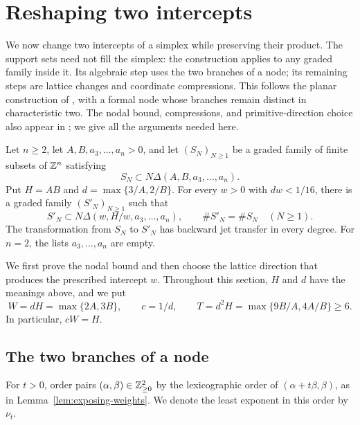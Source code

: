 \section{Reshaping two intercepts}\label{sec:reshape}

We now change two intercepts of a simplex while preserving their product.
The support sets need not fill the simplex: the construction applies to any
graded family inside it.  Its algebraic step uses the two branches of a node;
its remaining steps are lattice changes and coordinate compressions.
This follows the planar construction of
\citet[Section~4, Proposition~4.1]{OpenAI2026Higher}, with a formal node
whose branches remain distinct in characteristic two.  The nodal bound,
compressions, and primitive-direction choice also appear in
\citet[Propositions~3.2 and~3.4, Lemma~4.3]{OpenAI2026Surfaces};
we give all the arguments needed here.

\begin{proposition}\label{prop:reshape}
Let $n\ge2$, let $A,B,a_3,\ldots,a_n>0$, and let $(S_N)_{N\ge1}$ be a
graded family of finite subsets of $\mathbb Z^n$ satisfying
\[
 S_N\subset N\Delta(A,B,a_3,\ldots,a_n).
\]
Put $H=AB$ and $d=\max\{3/A,2/B\}$.  For every $w>0$ with $dw<1/16$,
there is a graded family $(S'_N)_{N\ge1}$ such that
\[
 S'_N\subset N\Delta(w,H/w,a_3,\ldots,a_n),
 \qquad \#S'_N=\#S_N \quad(N\ge1).
\]
The transformation from $S_N$ to $S'_N$ has backward jet transfer in every
degree.  For $n=2$, the lists $a_3,\ldots,a_n$ are empty.
\end{proposition}

We first prove the nodal bound and then choose the lattice direction that
produces the prescribed intercept $w$.  Throughout this section, $H$ and $d$
have the meanings above, and we put
\begin{equation}\label{eq:reshape-constants}
 W=dH=\max\{2A,3B\},\qquad c=1/d,\qquad
 T=d^2H=\max\{9B/A,4A/B\}\ge6.
\end{equation}
In particular, $cW=H$.

\subsection{The two branches of a node}

For $t>0$, order pairs $(\alpha,\beta)\in\mathbb Z_{\ge0}^2$ by the
lexicographic order of $(\alpha+t\beta,\beta)$, as in
Lemma~\ref{lem:exposing-weights}.  We denote the least exponent in this
order by $\nu_t$.

